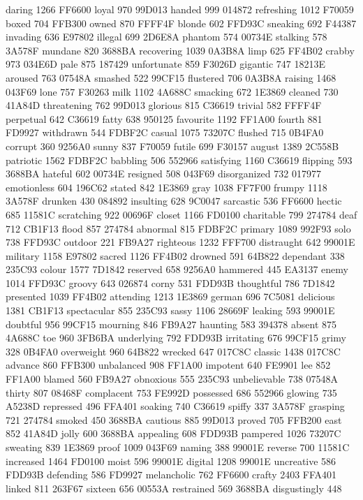 daring 1266 FF6600 loyal 970 99D013 handed 999 014872 refreshing 1012
F70059 boxed 704 FFB300 owned 870 FFFF4F blonde 602 FFD93C sneaking 692
F44387 invading 636 E97802 illegal 699 2D6E8A phantom 574 00734E
stalking 578 3A578F mundane 820 3688BA recovering 1039 0A3B8A limp 625
FF4B02 crabby 973 034E6D pale 875 187429 unfortunate 859 F3026D
gigantic 747 18213E aroused 763 07548A smashed 522 99CF15 flustered 706
0A3B8A raising 1468 043F69 lone 757 F30263 milk 1102 4A688C smacking
672 1E3869 cleaned 730 41A84D threatening 762 99D013 glorious 815
C36619 trivial 582 FFFF4F perpetual 642 C36619 fatty 638 950125
favourite 1192 FF1A00 fourth 881 FD9927 withdrawn 544 FDBF2C casual
1075 73207C flushed 715 0B4FA0 corrupt 360 9256A0 sunny 837 F70059
futile 699 F30157 august 1389 2C558B patriotic 1562 FDBF2C babbling 506
552966 satisfying 1160 C36619 flipping 593 3688BA hateful 602 00734E
resigned 508 043F69 disorganized 732 017977 emotionless 604 196C62
stated 842 1E3869 gray 1038 FF7F00 frumpy 1118 3A578F drunken 430
084892 insulting 628 9C0047 sarcastic 536 FF6600 hectic 685 11581C
scratching 922 00696F closet 1166 FD0100 charitable 799 274784 deaf 712
CB1F13 flood 857 274784 abnormal 815 FDBF2C primary 1089 992F93 solo
738 FFD93C outdoor 221 FB9A27 righteous 1232 FFF700 distraught 642
99001E military 1158 E97802 sacred 1126 FF4B02 drowned 591 64B822
dependant 338 235C93 colour 1577 7D1842 reserved 658 9256A0 hammered
445 EA3137 enemy 1014 FFD93C groovy 643 026874 corny 531 FDD93B
thoughtful 786 7D1842 presented 1039 FF4B02 attending 1213 1E3869
german 696 7C5081 delicious 1381 CB1F13 spectacular 855 235C93 sassy
1106 28669F leaking 593 99001E doubtful 956 99CF15 mourning 846 FB9A27
haunting 583 394378 absent 875 4A688C toe 960 3FB6BA underlying 792
FDD93B irritating 676 99CF15 grimy 328 0B4FA0 overweight 960 64B822
wrecked 647 017C8C classic 1438 017C8C advance 860 FFB300 unbalanced
908 FF1A00 impotent 640 FE9901 lee 852 FF1A00 blamed 560 FB9A27
obnoxious 555 235C93 unbelievable 738 07548A thirty 807 08468F
complacent 753 FE992D possessed 686 552966 glowing 735 A5238D repressed
496 FFA401 soaking 740 C36619 spiffy 337 3A578F grasping 721 274784
smoked 450 3688BA cautious 885 99D013 proved 705 FFB200 east 852 41A84D
jolly 600 3688BA appealing 608 FDD93B pampered 1026 73207C sweating 839
1E3869 proof 1009 043F69 naming 388 99001E reverse 700 11581C increased
1464 FD0100 moist 596 99001E digital 1208 99001E uncreative 586 FDD93B
defending 586 FD9927 melancholic 762 FF6600 crafty 2403 FFA401 linked
811 263F67 sixteen 656 00553A restrained 569 3688BA disgustingly 448
